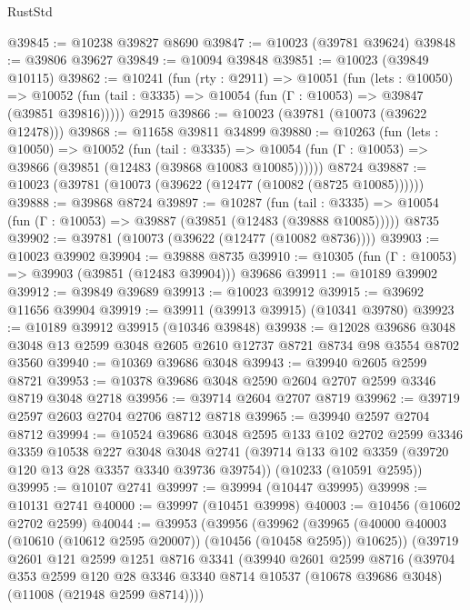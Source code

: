 \begin{lexlean}{RustStd}
\begin{coremodule}
@39845 := @10238 @39827 @8690
@39847 := @10023 (@39781 @39624)
@39848 := @39806 @39627
@39849 := @10094 @39848
@39851 := @10023 (@39849 @10115)
@39862 := @10241
    (fun (rty : @2911) =>
    @10051
      (fun (lets : @10050) =>
      @10052 (fun (tail : @3335) => @10054 (fun (Γ : @10053) => @39847 (@39851 @39816)))))
    @2915
@39866 := @10023 (@39781 (@10073 (@39622 @12478)))
@39868 := @11658 @39811 @34899
@39880 := @10263
    (fun (lets : @10050) =>
    @10052
      (fun (tail : @3335) =>
      @10054 (fun (Γ : @10053) => @39866 (@39851 (@12483 (@39868 @10083 @10085))))))
    @8724
@39887 := @10023 (@39781 (@10073 (@39622 (@12477 (@10082 (@8725 @10085))))))
@39888 := @39868 @8724
@39897 := @10287
    (fun (tail : @3335) => @10054 (fun (Γ : @10053) => @39887 (@39851 (@12483 (@39888 @10085)))))
    @8735
@39902 := @39781 (@10073 (@39622 (@12477 (@10082 @8736))))
@39903 := @10023 @39902
@39904 := @39888 @8735
@39910 := @10305 (fun (Γ : @10053) => @39903 (@39851 (@12483 @39904))) @39686
@39911 := @10189 @39902
@39912 := @39849 @39689
@39913 := @10023 @39912
@39915 := @39692 @11656 @39904
@39919 := @39911 (@39913 @39915) (@10341 @39780)
@39923 := @10189 @39912 @39915 (@10346 @39848)
@39938 := @12028
    @39686
    @3048
    @3048
    @13
    @2599
    @3048
    @2605
    @2610
    @12737
    @8721
    @8734
    @98
    @3554
    @8702
    @3560
@39940 := @10369 @39686 @3048
@39943 := @39940 @2605 @2599 @8721
@39953 := @10378 @39686 @3048 @2590 @2604 @2707 @2599 @3346 @8719 @3048 @2718
@39956 := @39714 @2604 @2707 @8719
@39962 := @39719 @2597 @2603 @2704 @2706 @8712 @8718
@39965 := @39940 @2597 @2704 @8712
@39994 := @10524
    @39686
    @3048
    @2595
    @133
    @102
    @2702
    @2599
    @3346
    @3359
    @10538
    @227
    @3048
    @3048
    @2741
    (@39714 @133 @102 @3359 (@39720 @120 @13 @28 @3357 @3340 @39736 @39754))
    (@10233 (@10591 @2595))
@39995 := @10107 @2741
@39997 := @39994 (@10447 @39995)
@39998 := @10131 @2741
@40000 := @39997 (@10451 @39998)
@40003 := @10456 (@10602 @2702 @2599)
@40044 := @39953
    (@39956
      (@39962
        (@39965 (@40000 @40003 (@10610 (@10612 @2595 @20007)) (@10456 (@10458 @2595)) @10625))
        (@39719
          @2601
          @121
          @2599
          @1251
          @8716
          @3341
          (@39940
            @2601
            @2599
            @8716
            (@39704
              @353
              @2599
              @120
              @28
              @3346
              @3340
              @8714
              @10537
              (@10678 @39686 @3048)
              (@11008 (@21948 @2599 @8714))))

\end{coremodule}
\end{lexlean}
